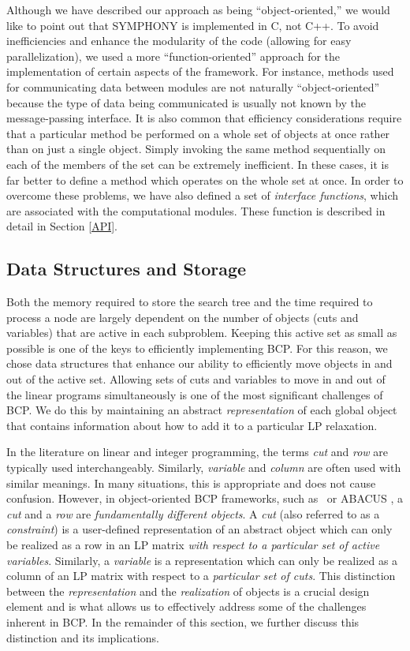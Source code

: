 Although we have described our approach as being ``object-oriented,''
we would like to point out that SYMPHONY is implemented in C, not C++.
To avoid inefficiencies and enhance the modularity of the code
(allowing for easy parallelization), we used a more
``function-oriented'' approach for the implementation of certain
aspects of the framework. For instance, methods used for communicating
data between modules are not naturally ``object-oriented'' because the
type of data being communicated is usually not known by the
message-passing interface. It is also common that efficiency
considerations require that a particular method be performed on a
whole set of objects at once rather than on just a single object.
Simply invoking the same method sequentially on each of the members of
the set can be extremely inefficient. In these cases, it is far better
to define a method which operates on the whole set at once. In order
to overcome these problems, we have also defined a set of {\em
interface functions}, which are associated with the computational
modules. These function is described in detail in Section \ref{API}.

\subsection{Data Structures and Storage}
\label{data-structures}

Both the memory required to store the search tree and the time
required to process a node are largely dependent on the number of
objects (cuts and variables) that are active in each subproblem.
Keeping this active set as small as possible is one of the keys to
efficiently implementing BCP. For this reason, we chose data
structures that enhance our ability to efficiently move objects in and
out of the active set. Allowing sets of cuts and variables to move in
and out of the linear programs simultaneously is one of the most
significant challenges of BCP. We do this by maintaining an abstract
{\em representation} of each global object that contains information
about how to add it to a particular LP relaxation. 

In the literature on linear and integer programming, the terms {\em
cut} and {\em row} are typically used interchangeably. Similarly, {\em
variable} and {\em column} are often used with similar meanings. In
many situations, this is appropriate and does not cause confusion.
However, in object-oriented BCP frameworks, such as \BB\ or ABACUS
\cite{abacus,abacus1}, a {\em cut} and a {\em row} are {\em fundamentally
different objects}. A {\em cut} (also referred to as a {\em
constraint}) is a user-defined representation of an abstract object
which can only be realized as a row in an LP matrix {\em with respect
to a particular set of active variables}. Similarly, a {\em variable}
is a representation which can only be realized as a column of an LP
matrix with respect to a {\em particular set of cuts}. This
distinction between the {\em representation} and the {\em realization}
of objects is a crucial design element and is what allows us to
effectively address some of the challenges inherent in BCP. In the
remainder of this section, we further discuss this distinction
and its implications.

